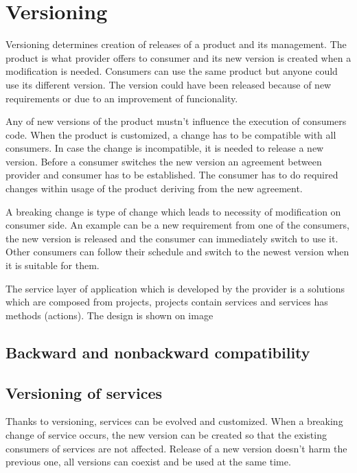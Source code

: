\chapter{Versioning}
\label{chap:versioning}

Versioning determines creation of releases of a product and its management. The product is what provider offers to consumer and its new version is created when a modification is needed. Consumers can use the same product but anyone could use its different version. The version could have been released because of new requirements or due to an improvement of funcionality. 

Any of new versions of the product mustn't influence the execution of consumers code. When the product is customized, a change has to be compatible with all consumers. In case the change is incompatible, it is needed to release a new version. Before a consumer switches the new version an agreement between provider and consumer has to be established. The consumer has to do required changes within usage of the product deriving from the new agreement.

A breaking change is type of change which leads to necessity of modification on consumer side. An example can be a new requirement from one of the consumers, the new version is released and the consumer can immediately switch to use it. Other consumers can follow their schedule and switch to the newest version when it is suitable for them. 

The service layer of application which is developed by the provider is a solutions which are composed from projects, projects contain services and services has methods (actions). The design is shown on image %

\section{Backward and nonbackward compatibility}


\section{Versioning of services}
\label{sec:verioningservices}
Thanks to versioning, services can be evolved and customized. When a breaking change of service occurs, the new version can be created so that the existing consumers of services are not affected. Release of a new version doesn't harm the previous one, all versions can coexist and be used at the same time. 

